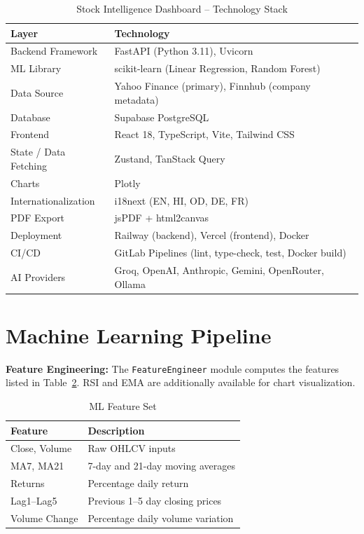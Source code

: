 \documentclass{book}
\begin{document}
\begin{table}[!h]
\begin{center}
\small
\begin{tabular}{|l|l|}
\hline
\textbf{Layer} & \textbf{Technology} \\
\hline
Backend Framework & FastAPI (Python 3.11), Uvicorn \\
ML Library & scikit-learn (Linear Regression, Random Forest) \\
Data Source & Yahoo Finance (primary), Finnhub (company metadata) \\
Database & Supabase PostgreSQL \\
Frontend & React 18, TypeScript, Vite, Tailwind CSS \\
State / Data Fetching & Zustand, TanStack Query \\
Charts & Plotly \\
Internationalization & i18next (EN, HI, OD, DE, FR) \\
PDF Export & jsPDF + html2canvas \\
Deployment & Railway (backend), Vercel (frontend), Docker \\
CI/CD & GitLab Pipelines (lint, type-check, test, Docker build) \\
AI Providers & Groq, OpenAI, Anthropic, Gemini, OpenRouter, Ollama \\
\hline
\end{tabular}
\caption{Stock Intelligence Dashboard -- Technology Stack}
\label{tab:stock_stack}
\end{center}
\end{table}

\section{Machine Learning Pipeline}

\par\noindent \textbf{Feature Engineering:} The \texttt{FeatureEngineer} module computes the features listed in Table~\ref{tab:features}. RSI and EMA are additionally available for chart visualization.

\begin{table}[!h]
\begin{center}
\small
\begin{tabular}{|l|l|}
\hline
\textbf{Feature} & \textbf{Description} \\
\hline
Close, Volume & Raw OHLCV inputs \\
MA7, MA21 & 7-day and 21-day moving averages \\
Returns & Percentage daily return \\
Lag1--Lag5 & Previous 1--5 day closing prices \\
Volume Change & Percentage daily volume variation \\
\hline
\end{tabular}
\caption{ML Feature Set}
\label{tab:features}
\end{center}
\end{table}
\end{document}
